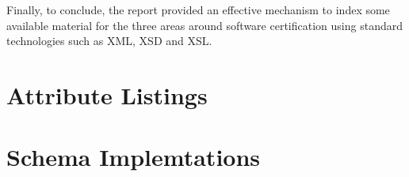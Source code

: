 \documentclass[11pt,letterpaper]{report}
\begin{document}
Finally, to conclude, the report provided an effective mechanism to index some available material for the three areas around software certification using standard technologies such as XML, XSD and XSL.

\appendix
\chapter{Attribute Listings}


 

 

  

\chapter{Schema Implemtations}






  

 







\end{document}
